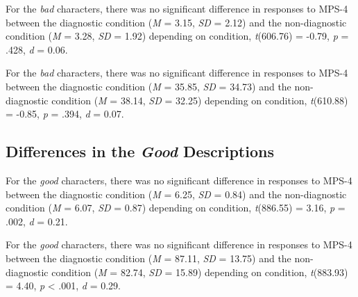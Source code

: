 \documentclass[
  english,
  man,floatsintext]{apa7}
\begin{document}
For the \emph{bad} characters, there was no significant difference in responses to MPS-4 between the diagnostic condition (\emph{M} = 3.15, \emph{SD} = 2.12) and the non-diagnostic condition (\emph{M} = 3.28, \emph{SD} = 1.92) depending on condition, \emph{t}(606.76) = -0.79, \emph{p} = .428, \emph{d} = 0.06.

For the \emph{bad} characters, there was no significant difference in responses to MPS-4 between the diagnostic condition (\emph{M} = 35.85, \emph{SD} = 34.73) and the non-diagnostic condition (\emph{M} = 38.14, \emph{SD} = 32.25) depending on condition, \emph{t}(610.88) = -0.85, \emph{p} = .394, \emph{d} = 0.07.

\hypertarget{differences-in-the-good-descriptions-1}{%
\subsection{\texorpdfstring{Differences in the \emph{Good} Descriptions}{Differences in the Good Descriptions}}\label{differences-in-the-good-descriptions-1}}

For the \emph{good} characters, there was no significant difference in responses to MPS-4 between the diagnostic condition (\emph{M} = 6.25, \emph{SD} = 0.84) and the non-diagnostic condition (\emph{M} = 6.07, \emph{SD} = 0.87) depending on condition, \emph{t}(886.55) = 3.16, \emph{p} = .002, \emph{d} = 0.21.

For the \emph{good} characters, there was no significant difference in responses to MPS-4 between the diagnostic condition (\emph{M} = 87.11, \emph{SD} = 13.75) and the non-diagnostic condition (\emph{M} = 82.74, \emph{SD} = 15.89) depending on condition, \emph{t}(883.93) = 4.40, \emph{p} \textless{} .001, \emph{d} = 0.29.
\end{document}
